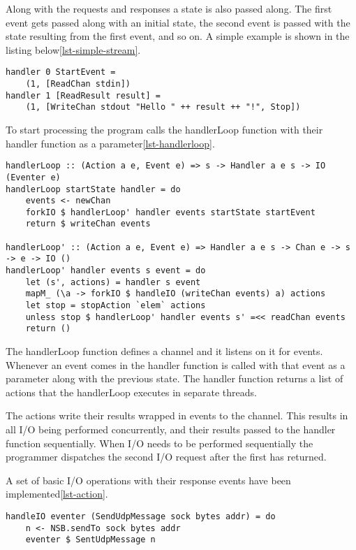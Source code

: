 Along with the requests and responses a state is also passed along. The first event gets passed along with an initial state, the second event is passed with the state resulting from the first event, and so on. A simple example is shown in the listing below\ref{lst-simple-stream}.

\begin{lstlisting}[caption={Stream-based example},label={lst-simple-stream}]
handler 0 StartEvent =
    (1, [ReadChan stdin])
handler 1 [ReadResult result] =
    (1, [WriteChan stdout "Hello " ++ result ++ "!", Stop])
\end{lstlisting}

To start processing the program calls the handlerLoop function with their handler function as a parameter\ref{lst-handlerloop}.

\begin{lstlisting}[caption={The handlerLoop}, label={lst-handlerloop}]
handlerLoop :: (Action a e, Event e) => s -> Handler a e s -> IO (Eventer e)
handlerLoop startState handler = do
    events <- newChan
    forkIO $ handlerLoop' handler events startState startEvent
    return $ writeChan events

handlerLoop' :: (Action a e, Event e) => Handler a e s -> Chan e -> s -> e -> IO ()
handlerLoop' handler events s event = do
    let (s', actions) = handler s event
    mapM_ (\a -> forkIO $ handleIO (writeChan events) a) actions
    let stop = stopAction `elem` actions
    unless stop $ handlerLoop' handler events s' =<< readChan events
    return ()
\end{lstlisting}

The handlerLoop function defines a channel and it listens on it for events. Whenever an event comes in the handler function is called with that event as a parameter along with the previous state. The handler function returns a list of actions that the handlerLoop executes in separate threads. 

The actions write their results wrapped in events to the channel. This results in all I/O being performed concurrently, and their results passed to the handler function sequentially.
When I/O needs to be performed sequentially the programmer dispatches the second I/O request after the first has returned.

A set of basic I/O operations with their response events have been implemented\ref{lst-action}.

\begin{lstlisting}[caption={Example of an Action, SendUdpMessage}, label={lst-action}]
handleIO eventer (SendUdpMessage sock bytes addr) = do
    n <- NSB.sendTo sock bytes addr
    eventer $ SentUdpMessage n
\end{lstlisting}
